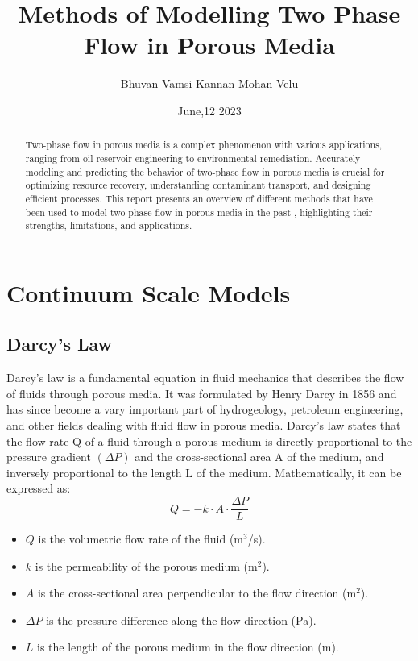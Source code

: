 \documentclass[letterpaper,12pt]{article}
\title{   \textbf{Methods of Modelling Two Phase Flow in Porous Media}}
\author{Bhuvan Vamsi Kannan Mohan Velu }
\date{June,12 2023}
\begin{document}
	\maketitle
	\begin{abstract}
		Two-phase flow in porous media is a complex phenomenon with various applications, ranging from oil reservoir engineering to environmental remediation. Accurately modeling and predicting the behavior of two-phase flow in porous media is crucial for optimizing resource recovery, understanding contaminant transport, and designing efficient processes. This report presents an overview of different methods that have been used to model two-phase flow in porous media in the past , highlighting their strengths, limitations, and applications.
	

     \end{abstract}

		\section{Continuum Scale Models}
		\subsection{Darcy's Law}
		Darcy's law is a fundamental equation in fluid mechanics that describes the flow of fluids through porous media. It was formulated by Henry Darcy in 1856 and has since become a vary important part of hydrogeology, petroleum engineering, and other fields dealing with fluid flow in porous media.
		Darcy's law states that the flow rate Q of a fluid through a porous medium is directly proportional to the pressure gradient $(\Delta P)$ and the cross-sectional area A of the medium, and inversely proportional to the length L of the medium. Mathematically, it can be expressed as:
	\begin{equation}
		
			Q = - k \cdot A \cdot \frac{\Delta P}{L}
	\end{equation}
		\begin{itemize}
			\item $Q$ is the volumetric flow rate of the fluid (m$^3$/s).
			\item $k$ is the permeability of the porous medium (m$^2$).
			\item $A$ is the cross-sectional area perpendicular to the flow direction (m$^2$).
			\item $\Delta P$ is the pressure difference along the flow direction (Pa).
			\item $L$ is the length of the porous medium in the flow direction (m).
		\end{itemize}
		
\end{document}
